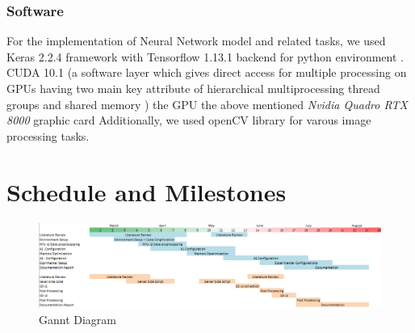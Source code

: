 \subsubsection{Software} 
\label{Chapter4:Software_i}
For the implementation of Neural Network model and related tasks, we used Keras 2.2.4 framework with Tensorflow 1.13.1  backend for python environment \cite{tensorflow2015-whitepaper}. CUDA 10.1 (a software layer which gives direct access for multiple processing on GPUs having two main key attribute of hierarchical multiprocessing thread groups and shared memory \cite{nickolls2008scalable}) the GPU  the above mentioned  \textit{Nvidia Quadro RTX 8000} graphic card  Additionally, we used openCV library \cite{opencv_library} for varous image processing tasks.



\newpage








\section{Schedule and Milestones}

\begin{figure}[h]
\centering
    \includegraphics[angle=90]{Figures/gannt.png}
    \caption{Gannt Diagram }
    \label{fig:Gannt_Dia}
\end{figure}
